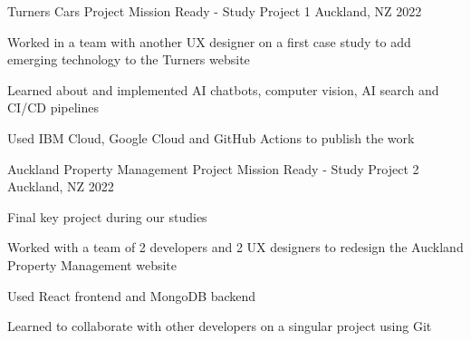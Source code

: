 

\begin{cventries}

  \cventry
    {Turners Cars Project} %
    {Mission Ready - Study Project 1} %
    {Auckland, NZ} %
    {2022} %
    {
      \begin{cvitems} %
        \item {Worked in a team with another UX designer on a first case study to add emerging technology to the Turners website}
        \item {Learned about and implemented AI chatbots, computer vision, AI search and CI/CD pipelines}
        \item {Used IBM Cloud, Google Cloud and GitHub Actions to publish the work}
      \end{cvitems}
    }

  \cventry
    {Auckland Property Management Project} %
    {Mission Ready - Study Project 2} %
    {Auckland, NZ} %
    {2022} %
    {
      \begin{cvitems} %
        \item {Final key project during our studies}
        \item {Worked with a team of 2 developers and 2 UX designers to redesign the Auckland Property Management website}
        \item {Used React frontend and MongoDB backend}
        \item {Learned to collaborate with other developers on a singular project using Git}
      \end{cvitems}
    }


\end{cventries}

